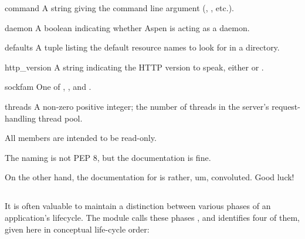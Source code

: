 \begin{memberdesc}[string]{command}
A string giving the command line argument (, , etc.).
\end{memberdesc}

\begin{memberdesc}[boolean]{daemon}
A boolean indicating whether Aspen is acting as a daemon.
\end{memberdesc}

\begin{memberdesc}[tuple]{defaults}
A tuple listing the default resource names to look for in a directory.
\end{memberdesc}

\begin{memberdesc}[string]{http_version}
A string indicating the HTTP version to speak, either  or .
\end{memberdesc}

\begin{memberdesc}[int]{sockfam}
One of , , and .
\end{memberdesc}

\begin{memberdesc}[int]{threads}
A non-zero positive integer; the number of threads in the server's
request-handling thread pool.
\end{memberdesc}


All members are intended to be read-only.


\begin{seealso}

{}{The naming is not PEP 8, but the documentation is fine.}

 {}{On
the other hand, the documentation for  is rather, um,
convoluted. Good luck!}

\end{seealso}


\subsection{}


It is often valuable to maintain a distinction between various phases of an
application's lifecycle. The  module calls these phases
, and identifies four of them, given here in conceptual life-cycle
order:

